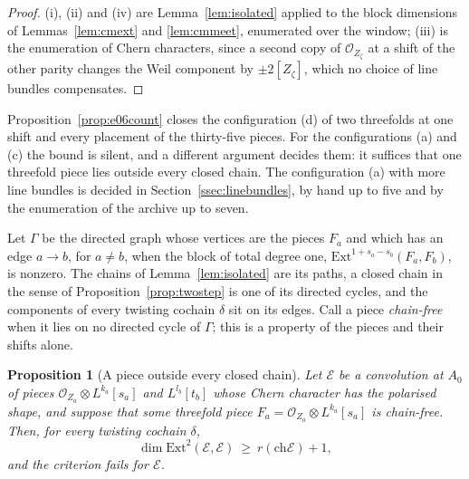 \documentclass[11pt,reqno]{amsart}
\numberwithin{equation}{section}
\theoremstyle{plain}
\newtheorem{proposition}[theorem]{Proposition}
\theoremstyle{definition}
\newcommand{\Ext}{\mathrm{Ext}}
\newcommand{\ch}{\mathrm{ch}}
\begin{document}
\begin{proof}
(i), (ii) and (iv) are Lemma~\ref{lem:isolated} applied to the block dimensions of Lemmas~\ref{lem:cmext} and \ref{lem:cmmeet}, enumerated over the window; (iii) is the enumeration of Chern characters, since a second copy of $\mathcal{O}_{Z_{\zeta}}$ at a shift of the other parity changes the Weil component by $\pm2[Z_{\zeta}]$, which no choice of line bundles compensates.
\end{proof}

Proposition~\ref{prop:e06count} closes the configuration (d) of two threefolds at one shift and every placement of the thirty-five pieces. For the configurations (a) and (c) the bound is silent, and a different argument decides them: it suffices that one threefold piece lies outside every closed chain. The configuration (a) with more line bundles is decided in Section~\ref{ssec:linebundles}, by hand up to five and by the enumeration of the archive up to seven.

Let $\Gamma$ be the directed graph whose vertices are the pieces $F_{a}$ and which has an edge $a\to b$, for $a\ne b$, when the block of total degree one, $\Ext^{1+s_{a}-s_{b}}(F_{a},F_{b})$, is nonzero. The chains of Lemma~\ref{lem:isolated} are its paths, a closed chain in the sense of Proposition~\ref{prop:twostep} is one of its directed cycles, and the components of every twisting cochain $\delta$ sit on its edges. Call a piece \emph{chain-free} when it lies on no directed cycle of $\Gamma$; this is a property of the pieces and their shifts alone.

\begin{proposition}[A piece outside every closed chain]\label{prop:chainfree}
Let $\mathcal{E}$ be a convolution at $A_{0}$ of pieces $\mathcal{O}_{Z_{a}}\otimes L^{k_{a}}[s_{a}]$ and $L^{l_{b}}[t_{b}]$ whose Chern character has the polarised shape, and suppose that some threefold piece $F_{a}=\mathcal{O}_{Z_{a}}\otimes L^{k_{a}}[s_{a}]$ is chain-free. Then, for every twisting cochain $\delta$,
\[
\dim\Ext^{2}(\mathcal{E},\mathcal{E})\ \ge\ r(\ch\mathcal{E})+1 ,
\]
and the criterion fails for $\mathcal{E}$.
\end{proposition}
\end{document}
